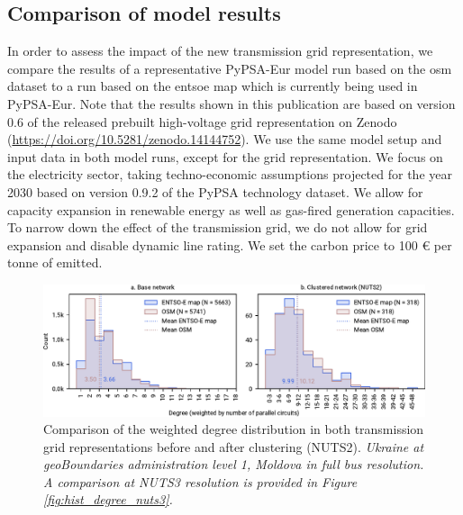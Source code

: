 \documentclass[fleqn,10pt]{wlscirep}
\let\autocite\cite
\begin{document}
\subsection*{Comparison of model results}
In order to assess the impact of the new transmission grid representation, we compare the results of a representative PyPSA-Eur model run based on the \gls{osm} dataset to a run based on the \acrshort{entsoe} map which is currently being used in PyPSA-Eur. \autocite{horschPyPSAEurOpenOptimisation2018} Note that the results shown in this publication are based on version 0.6 of the released prebuilt high-voltage grid representation on Zenodo (\href{https://doi.org/10.5281/zenodo.14144752}{https://doi.org/10.5281/zenodo.14144752}).\autocite{xiongPrebuiltElectricityNetwork2024} We use the same model setup and input data in both model runs, except for the grid representation. We focus on the electricity sector, taking techno-economic assumptions projected for the year 2030 based on version 0.9.2 of the PyPSA technology dataset. \autocite{lisazeyenPyPSATechnologydataV0922024} We allow for capacity expansion in renewable energy as well as gas-fired generation capacities. To narrow down the effect of the transmission grid, we do not allow for grid expansion and disable dynamic line rating. We set the carbon price to 100 \euro{} per tonne of  emitted.

\begin{figure}[!htbp]
    \centering
    \includegraphics{figures/fig_hist_degree_nuts2.pdf}
    \caption{Comparison of the weighted degree distribution in both transmission grid representations before and after clustering (NUTS2). \textit{Ukraine at geoBoundaries\autocite{runfolaGeoBoundariesGlobalDatabase2020} administration level 1, Moldova in full bus resolution. A comparison at NUTS3 resolution is provided in Figure \ref{fig:hist_degree_nuts3}.}}
    \label{fig:hist_degree_nuts2}
\end{figure}
\end{document}
